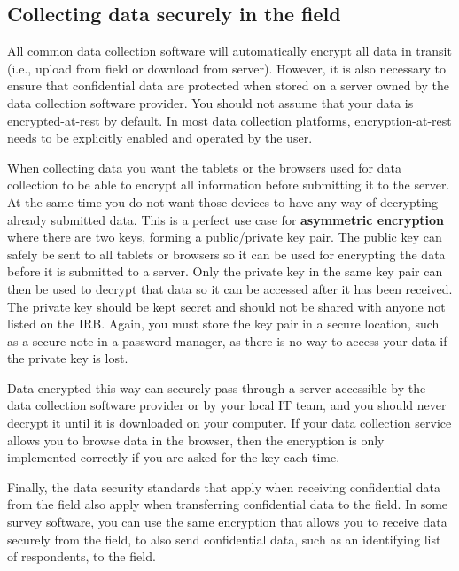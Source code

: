 \subsection{Collecting data securely in the field}

All common data collection software will automatically encrypt
all data in transit (i.e., upload from field or download from server).
However, it is also necessary to ensure that confidential data
are protected when stored on a server owned by the data collection software provider.
You should not assume that your data is encrypted-at-rest by default.
In most data collection platforms,
encryption-at-rest needs to be explicitly enabled and operated by the user.

When collecting data you want the tablets or the browsers used for data collection
to be able to encrypt all information before submitting it to the server.
At the same time you do not want those devices to have any way of decrypting already submitted data.
This is a perfect use case for \textbf{asymmetric encryption}
where there are two keys, forming a public/private key pair.
The public key can safely be sent to all tablets or browsers so it can be used for encrypting the data before it is submitted to a server.
Only the private key in the same key pair can then be used to decrypt that data
so it can be accessed after it has been received.
The private key should be kept secret and should not be shared with anyone not listed on the IRB.
Again, you must store the key pair in a secure location,
such as a secure note in a password manager,
as there is no way to access your data if the private key is lost.

Data encrypted this way can securely pass
through a server accessible by the data collection software provider
or by your local IT team,
and you should never decrypt it until it is downloaded on your computer.
If your data collection service allows you to browse data in the browser,
then the encryption is only implemented correctly if you are asked for the key each time.

Finally, the data security standards that apply
when receiving confidential data from the field
also apply when transferring confidential data to the field.
In some survey software,
you can use the same encryption that allows you to receive data securely
from the field, to also send confidential data,
such as an identifying list of respondents, to the field.

